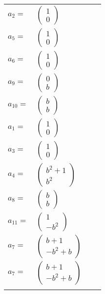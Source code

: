 \documentclass[1p]{elsarticle_modified}
\theoremstyle{definition}
\begin{document}
\begin{tabular}{m{7pt} m{180pt} m{7pt} m{180pt} }
\flushright $a_{2}=$&$\begin{pmatrix}1\\0\end{pmatrix}$ \\
\flushright $a_{5}=$&$\begin{pmatrix}1\\0\end{pmatrix}$ \\
\flushright $a_{6}=$&$\begin{pmatrix}1\\0\end{pmatrix}$ \\
\flushright $a_{9}=$&$\begin{pmatrix}0\\b\end{pmatrix}$ \\
\flushright $a_{10}=$&$\begin{pmatrix}b\\b\end{pmatrix}$ \\
\flushright $a_{1}=$&$\begin{pmatrix}1\\0\end{pmatrix}$ \\
\flushright $a_{3}=$&$\begin{pmatrix}1\\0\end{pmatrix}$ \\
\flushright $a_{4}=$&$\begin{pmatrix}b^2+1\\b^2\end{pmatrix}$ \\
\flushright $a_{8}=$&$\begin{pmatrix}b\\b\end{pmatrix}$ \\
\flushright $a_{11}=$&$\begin{pmatrix}1\\- b^2\end{pmatrix}$ \\
\flushright $a_{7}=$&$\begin{pmatrix}b+1\\- b^2+b\end{pmatrix}$\\ \flushright $a_{7}=$&$\begin{pmatrix}b+1\\- b^2+b\end{pmatrix}$\\&\end{tabular}
\end{document}
